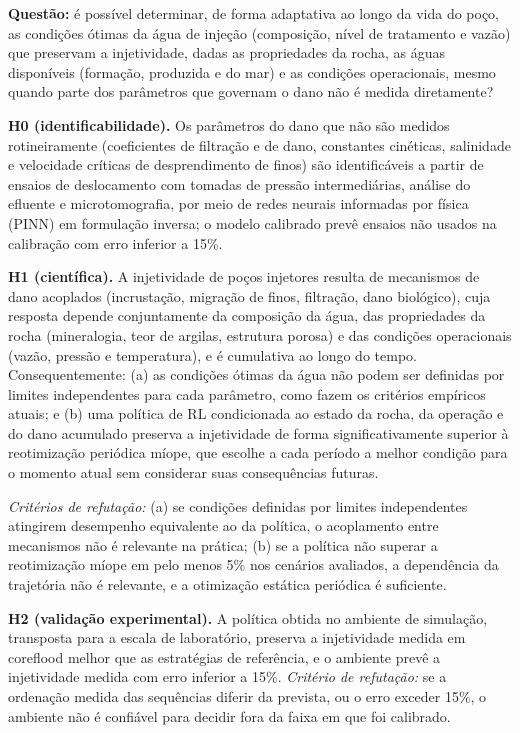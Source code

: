 \documentclass[11pt,a4paper]{article}
\begin{document}
\textbf{Questão:} é possível determinar, de forma adaptativa ao longo da vida do poço, as
condições ótimas da água de injeção (composição, nível de tratamento e vazão) que
preservam a injetividade, dadas as propriedades da rocha, as águas disponíveis (formação,
produzida e do mar) e as condições operacionais, mesmo quando parte dos parâmetros que
governam o dano não é medida diretamente?

\textbf{H0 (identificabilidade).} Os parâmetros do dano que não são medidos rotineiramente
(coeficientes de filtração e de dano, constantes cinéticas, salinidade e velocidade
críticas de desprendimento de finos) são identificáveis a partir de ensaios de
deslocamento com tomadas de pressão intermediárias, análise do efluente e microtomografia,
por meio de redes neurais informadas por física (PINN) em formulação inversa; o modelo
calibrado prevê ensaios não usados na calibração com erro inferior a 15\%.

\textbf{H1 (científica).} A injetividade de poços injetores resulta de mecanismos de dano
acoplados (incrustação, migração de finos, filtração, dano biológico), cuja resposta depende
conjuntamente da composição da água, das propriedades da rocha (mineralogia, teor de
argilas, estrutura porosa) e das condições operacionais (vazão, pressão e temperatura), e
é cumulativa ao longo do tempo. Consequentemente: (a) as condições ótimas da água não
podem ser definidas por limites independentes para cada parâmetro, como fazem os
critérios empíricos atuais; e (b) uma política de RL condicionada ao estado da rocha, da
operação e do dano acumulado preserva a injetividade de forma significativamente
superior à reotimização periódica míope, que escolhe a cada período a melhor condição
para o momento atual sem considerar suas consequências futuras.

\textit{Critérios de refutação:} (a) se condições definidas por limites independentes
atingirem desempenho equivalente ao da política, o acoplamento entre mecanismos não é
relevante na prática; (b) se a política não superar a reotimização míope em pelo menos
5\% nos cenários avaliados, a dependência da trajetória não é relevante, e a
otimização estática periódica é suficiente.

\textbf{H2 (validação experimental).} A política obtida no ambiente de simulação,
transposta para a escala de laboratório, preserva a injetividade medida em coreflood
melhor que as estratégias de referência, e o ambiente prevê a injetividade medida com erro
inferior a 15\%. \textit{Critério de refutação:} se a ordenação medida das sequências
diferir da prevista, ou o erro exceder 15\%, o ambiente não é confiável para decidir fora
da faixa em que foi calibrado.
\end{document}
